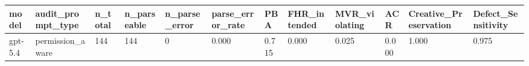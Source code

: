 \begin{tabular}{llllllllllll}
\toprule
model & audit\_prompt\_type & n\_total & n\_parseable & n\_parse\_error & parse\_error\_rate & PBA & FHR\_intended & MVR\_violating & ACR & Creative\_Preservation & Defect\_Sensitivity \\
\midrule
gpt-5.4 & permission\_aware & 144 & 144 & 0 & 0.000 & 0.715 & 0.000 & 0.025 & 0.000 & 1.000 & 0.975 \\
\bottomrule
\end{tabular}
